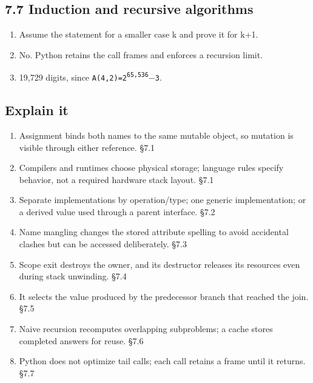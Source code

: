 \documentclass[11pt]{article}
\begin{document}
\begin{keepsection}\subsection{7.7 Induction and recursive algorithms}

\begin{enumerate}
\item Assume the statement for a smaller case k and prove it for k+1.
\item No. Python retains the call frames and enforces a recursion limit.
\item 19,729 digits, since \texttt{A(4,2)=2\textsuperscript{65,536}\ensuremath{-}3}.
\end{enumerate}

\end{keepsection}
\begin{keepsection}\subsection{Explain it}

\begin{enumerate}
\item Assignment binds both names to the same mutable object, so mutation is visible through either reference. \hfill{\small\color{FAUblue}§7.1}
\item Compilers and runtimes choose physical storage; language rules specify behavior, not a required hardware stack layout. \hfill{\small\color{FAUblue}§7.1}
\item Separate implementations by operation/type; one generic implementation; or a derived value used through a parent interface. \hfill{\small\color{FAUblue}§7.2}
\item Name mangling changes the stored attribute spelling to avoid accidental clashes but can be accessed deliberately. \hfill{\small\color{FAUblue}§7.3}
\item Scope exit destroys the owner, and its destructor releases its resources even during stack unwinding. \hfill{\small\color{FAUblue}§7.4}
\item It selects the value produced by the predecessor branch that reached the join. \hfill{\small\color{FAUblue}§7.5}
\item Naive recursion recomputes overlapping subproblems; a cache stores completed answers for reuse. \hfill{\small\color{FAUblue}§7.6}
\item Python does not optimize tail calls; each call retains a frame until it returns. \hfill{\small\color{FAUblue}§7.7}
\end{enumerate}

\end{keepsection}
\end{document}
